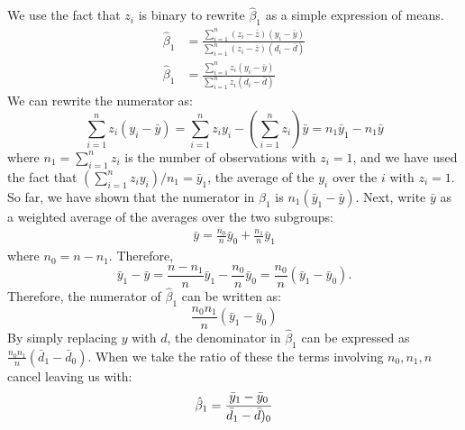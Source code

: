 \documentclass[11pt]{article}
\begin{document}
\begin{procedure}
We use the fact that $z_i$ is binary to rewrite $\hat{\beta}_1$ as a simple expression of means.
\begin{align*}
    \hat{\beta}_1&=\frac{\sum_{i=1}^n\left(z_i-\bar{z}\right)\left(y_i-\bar{y}\right)}{\sum_{i=1}^n\left(z_i-\bar{z}\right)\left(d_i-\bar{d}\right)} \\
    \hat{\beta}_1&=\frac{\sum_{i=1}^n z_i\left(y_i-\bar{y}\right)}{\sum_{i=1}^n z_i\left(d_i-\bar{d}\right)}
\end{align*}
We can rewrite the numerator as:
\begin{equation}
\sum_{i=1}^n z_i\left(y_i-\bar{y}\right)=\sum_{i=1}^n z_i y_i-\left(\sum_{i=1}^n z_i\right) \bar{y}=n_1 \bar{y}_1-n_1 \bar{y}
\end{equation}
where $n_1=\sum_{i=1}^n z_i$ is the number of observations with $z_i=1$, and we have used the fact that $\left(\sum_{i=1}^n z_i y_i\right) / n_1=\bar{y}_1$, the average of the $y_i$ over the $i$ with $z_i=1$. So far, we have shown that the numerator in $\hat{\beta}_1$ is $n_1\left(\bar{y}_1-\bar{y}\right)$. Next, write $\bar{y}$ as a weighted average of the averages over the two subgroups:
\begin{align*}
\bar{y}=\frac{n_0}{n} \bar{y}_0+\frac{n_1}{n} \bar{y}_1
\end{align*}
where $n_0 = n-n_1$. Therefore, 
\begin{equation}
\bar{y}_1-\bar{y}=\frac{n-n_1}{n} \bar{y}_1-\frac{n_0}{n} \bar{y}_0=\frac{n_0}{n}\left(\bar{y}_1-\bar{y}_0\right) .
\end{equation}
Therefore, the numerator of $\hat{\beta}_1$ can be written as:
\begin{equation}
\frac{n_0 n_1}{n}\left(\bar{y}_1-\bar{y}_0\right)
\end{equation}
By simply replacing $y$ with $d$, the denominator in $\hat{\beta}_1$ can be expressed as $\frac{n_0n_1}{n}(\bar{d}_1 - \bar{d}_0)$. When we take the ratio of these the terms involving $n_0, n_1, n$ cancel leaving us with:
\[\hat{\beta}_1 = \dfrac{\Bar{y}_1 - \Bar{y}_0}{\Bar{d}_1 - \Bar{d})_0}\]
\end{procedure}
\end{document}
